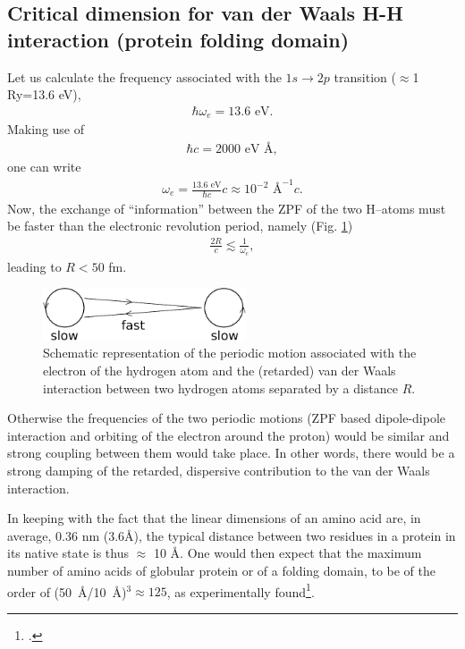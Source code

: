 \begin{subappendices}
 \subsection{Critical dimension for van der Waals H-H interaction (protein folding domain)}
 Let us calculate the frequency associated with the $1s\to 2p$ transition ($\approx$1 Ry=13.6 eV),
 \begin{align}\label{eq2.D.22}
\hbar\omega_e=13.6\text{ eV}.    
 \end{align} 
 Making use of
 \begin{align}\label{eq2.D.23}
 \hbar c=2000\text{ eV \AA},
 \end{align} 
 one can write
 \begin{align}\label{eq2.D.24}
 \omega_e=\frac{13.6\text{ eV}}{\hbar c}c\approx 10^{-2}\text{ \AA}^{-1}c.
 \end{align} 
 Now, the exchange of ``information'' between the ZPF of the two H--atoms must be faster than the electronic revolution period, namely (Fig. \ref{fig2.D.6})
  \begin{align}\label{eq2.D.25}
  \frac{2R}{c}\lesssim\frac{1}{\omega_e},
  \end{align} 
  leading to $R<50$ fm.
       \begin{figure}[h]
        \centerline{\includegraphics*[width=6cm,angle=0]{nutshell/figs/fig2D6_v2.pdf}}
        \caption{Schematic representation of the periodic motion associated with the electron of the hydrogen atom and the (retarded) van der Waals interaction between two hydrogen atoms separated by a distance $R$.}\label{fig2.D.6}
        \end{figure}
 Otherwise the frequencies of the two periodic motions (ZPF based dipole-dipole interaction and orbiting of the electron around the proton) would be similar and strong coupling between them would take place. In other words, there would be a strong damping of the retarded, dispersive contribution to the van der Waals interaction.
 
 In keeping with the fact that the linear dimensions of an amino acid are, in average, 0.36 nm (3.6\AA), the typical distance between two residues in a protein in its native state is thus $\approx$ 10 \AA. One would then expect that the maximum number of amino acids of globular protein or of a folding domain, to be of the order of \mbox{(50 \AA/10 \AA)$^{3}\approx 125$}, as experimentally found\footnote{\cite{Rost:97}.}.

\end{subappendices}

